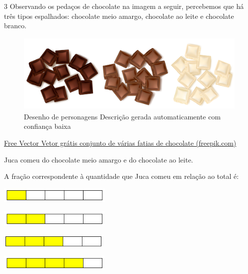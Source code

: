 \begin{escolha}
{{\num{3} Observando os pedaços de chocolate na imagem a seguir, percebemos 
que há três tipos espalhados: chocolate meio amargo, chocolate ao leite e
chocolate branco. 

\begin{figure}
\centering
\includegraphics[width=4.54097in,height=1.51544in]{./_SAEB_9_MAT/media/image53.png}
\caption{Desenho de personagens Descrição gerada automaticamente com
confiança baixa}
\end{figure}

\href{https://br.freepik.com/vetores-gratis/conjunto-de-varias-fatias-de-chocolate_10155086.htm\#page=2\&query=chocolate\&position=49\&from_view=search\&track=sph}{Free
Vector \textbar{} Vetor grátis conjunto de várias fatias de chocolate
(freepik.com)}

Juca comeu  do chocolate meio amargo e  do
chocolate ao leite.

A fração correspondente à quantidade que Juca comeu em relação ao total
é:

\begin{escolha}

\item
  \includegraphics[width=2.11685in,height=0.29169in]{./_SAEB_9_MAT/media/image54.png}
\item
  \includegraphics[width=2.10852in,height=0.30003in]{./_SAEB_9_MAT/media/image55.png}
\item
  \includegraphics[width=2.08351in,height=0.25002in]{./_SAEB_9_MAT/media/image56.png}
\item
  \includegraphics[width=2.10852in,height=0.30003in]{./_SAEB_9_MAT/media/image57.png}
\end{escolha}

}}
\end{escolha}
